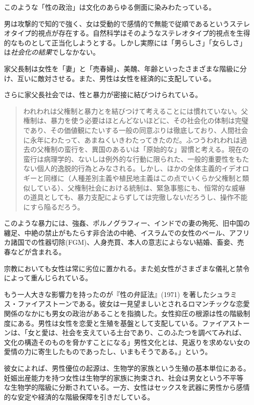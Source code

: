 \documentclass[dvipdfmx,uplatex]{jsarticle}
\begin{document}
このような「性の政治」は文化のあらゆる側面に染みわたっている。

男は攻撃的で知的で強く、女は受動的で感情的で無能で従順であるというステレオタイプ的視点が存在する。自然科学はそのようなステレオタイプ的視点を生得的なものとして正当化しようとする。しかし実際には「男らしさ」「女らしさ」は\emph{社会化の結果}でしなかない。

家父長制は女性を「妻」と「売春婦」、美醜、年齢といったさまざまな階級に分け、互いに敵対させる。また、男性は女性を経済的に支配している。

さらに家父長社会では、性と暴力が密接に結びつけられている。

\begin{quote}
  われわれは父権制と暴力とを結びつけて考えることには慣れていない。父権制は、暴力を使う必要はほとんどないほどに、その社会化の体制は完璧であり、その価値観にたいする一般の同意ぶりは徹底しており、人間社会に永年にわたって、あまねくいきわたってきたのだ。ふつうわれわれは過去の父権制の蛮行を、異国のあるいは「原始的な」習慣と考える。現在の蛮行は病理学的、ないしは例外的な行動に限られた、一般的重要性をもたない個人的逸脱的行為とみなされる。しかし、ほかの全体主義的イデオロギーと同様に（人種差別主義や植民地主義はこの点でいくらか父権制と類似している）、父権制社会における統制は、緊急事態にも、恒常的な威嚇の道具としても、暴力支配によらずしては完徹しないだろうし、操作不能にすら陥るだろう。
\end{quote}

このような暴力には、強姦、ポルノグラフィー、インドでの妻の殉死、旧中国の纏足、中絶の禁止がもたらす非合法の中絶、イスラムでの女性のベール、アフリカ諸国での性器切除(FGM)、人身売買、本人の意志によらない結婚、畜妾、売春などが含まれる。


宗教においても女性は常に劣位に置かれる。また処女性がさまざまな儀礼と禁令によって重んじられている。


\vspace{1zw}もう一人大きな影響力を持ったのが『性の弁証法』(1971) \citep{firestone70:_dialec_of_sex}を著したシュラミス・ファイアストーンである。彼女は一見望ましいとされるロマンチックな恋愛関係のなかにも男女の政治があることを指摘した。女性抑圧の根源は性の階級制度にある。男性は女性を恋愛と生殖を基盤として支配している。ファイアストーンは、「女と愛は、社会を支えている土台であり、このふたつを調べてみれば、文化の構造そのものを脅かすことになる」男性文化とは、見返りを求めない女の愛情の力に寄生したものであったし、いまもそうである。」という。

彼女によれば、男性優位の起源は、生物学的家族という生殖の基本単位にある。妊娠出産能力を持つ女性は生物学的家族に拘束され、社会は男女という不平等な生物学的階級に分断されている。一方、女性はセックスを武器に男性から感情的な安定や経済的な階級保障を引きだしている。
\end{document}
